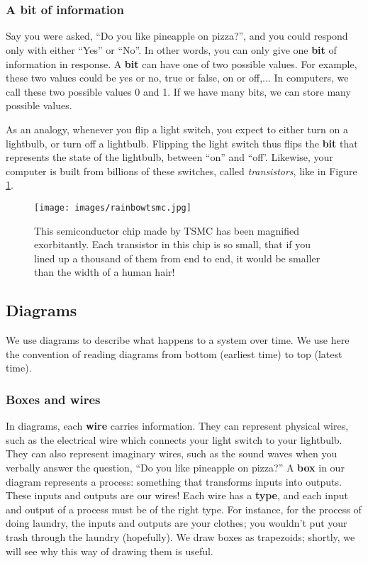 \documentclass{article}
\begin{document}
\tableofcontents

\section{}
\subsubsection{A \textbf{bit} of information}
Say you were asked, ``Do you like pineapple on pizza?'', and you could respond only with either ``Yes'' or ``No''.
In other words, you can only give one \textbf{bit} of information in response.
A \textbf{bit} can have one of two possible values.  For example, these two values could be yes or no, true or false, on or off,...
In computers, we call these two possible values 0 and 1.  If we have many bits, we can store many possible values.

As an analogy, whenever you flip a light switch, you expect to either turn on a lightbulb, or turn off a lightbulb.
Flipping the light switch thus flips the \textbf{bit} that represents the state of the lightbulb, between ``on'' and ``off'.
Likewise, your computer is built from billions of these switches, called \textit{transistors}, like in Figure \ref{fig:tsmc}.
\begin{figure}[h!]%
	\label{fig:tsmc}
	\texttt{[image: images/rainbowtsmc.jpg]}
	\caption{This semiconductor chip made by TSMC has been magnified exorbitantly.  Each transistor in this chip is so small, that if you lined up a thousand of them from end to end, it would be smaller than the width of a human hair!}
\end{figure}

\subsection{Diagrams}
We use diagrams to describe what happens to a system over time.  We use here the convention of reading diagrams from bottom (earliest time) to top (latest time).
\subsubsection{\textbf{Boxes} and \textbf{wires}}
In diagrams, each \textbf{wire} carries information.  They can represent physical wires, such as the electrical wire which connects your light switch to your lightbulb.  They can also represent imaginary wires, such as the sound waves when you verbally answer the question, ``Do you like pineapple on pizza?''
A \textbf{box} in our diagram represents a process: something that transforms inputs into outputs.
These inputs and outputs are our wires!  Each wire has a \textbf{type}, and each input and output of a process must be of the right type.  For instance, for the process of doing laundry, the inputs and outputs are your clothes; you wouldn't put your trash through the laundry (hopefully).
We draw boxes as trapezoids; shortly, we will see why this way of drawing them is useful.
\end{document}
